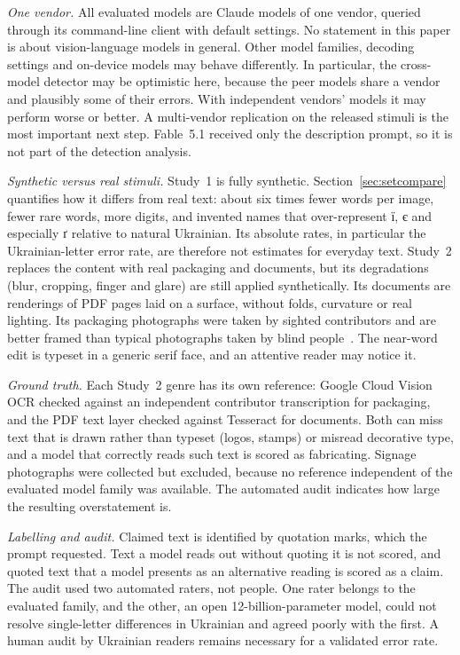 \emph{One vendor.} All evaluated models are Claude models of one vendor, queried through its command-line client with default settings. No statement in this paper is about vision-language models in general. Other model families, decoding settings and on-device models may behave differently. In particular, the cross-model detector may be optimistic here, because the peer models share a vendor and plausibly some of their errors. With independent vendors' models it may perform worse or better. A multi-vendor replication on the released stimuli is the most important next step. Fable~5.1 received only the description prompt, so it is not part of the detection analysis.

\emph{Synthetic versus real stimuli.} Study~1 is fully synthetic. Section~\ref{sec:setcompare} quantifies how it differs from real text: about six times fewer words per image, fewer rare words, more digits, and invented names that over-represent \foreignlanguage{ukrainian}{ї}, \foreignlanguage{ukrainian}{є} and especially \foreignlanguage{ukrainian}{ґ} relative to natural Ukrainian. Its absolute rates, in particular the Ukrainian-letter error rate, are therefore not estimates for everyday text. Study~2 replaces the content with real packaging and documents, but its degradations (blur, cropping, finger and glare) are still applied synthetically. Its documents are renderings of PDF pages laid on a surface, without folds, curvature or real lighting. Its packaging photographs were taken by sighted contributors and are better framed than typical photographs taken by blind people~\cite{gurari2018vizwiz}. The near-word edit is typeset in a generic serif face, and an attentive reader may notice it.

\emph{Ground truth.} Each Study~2 genre has its own reference: Google Cloud Vision OCR checked against an independent contributor transcription for packaging, and the PDF text layer checked against Tesseract for documents. Both can miss text that is drawn rather than typeset (logos, stamps) or misread decorative type, and a model that correctly reads such text is scored as fabricating. Signage photographs were collected but excluded, because no reference independent of the evaluated model family was available. The automated audit indicates how large the resulting overstatement is.

\emph{Labelling and audit.} Claimed text is identified by quotation marks, which the prompt requested. Text a model reads out without quoting it is not scored, and quoted text that a model presents as an alternative reading is scored as a claim. The audit used two automated raters, not people. One rater belongs to the evaluated family, and the other, an open 12-billion-parameter model, could not resolve single-letter differences in Ukrainian and agreed poorly with the first. A human audit by Ukrainian readers remains necessary for a validated error rate.

